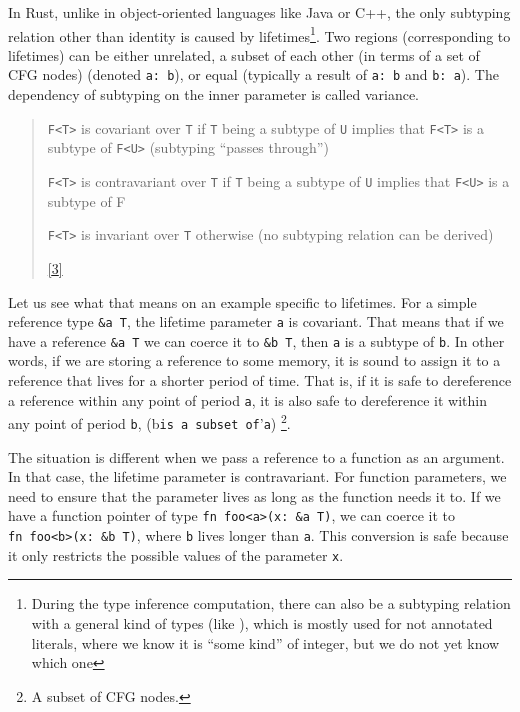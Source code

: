 \documentclass[
  11pt,
  twoside,symmetric]{report}
\begin{document}
In Rust, unlike in object-oriented languages like Java or C++, the only
subtyping relation other than identity is caused by
lifetimes\footnote{During the type inference computation, there can also
  be a subtyping relation with a general kind of types (like ), which is
  mostly used for not annotated literals, where we know it is ``some
  kind'' of integer, but we do not yet know which one}. Two regions
(corresponding to lifetimes) can be either unrelated, a subset of each
other (in terms of a set of CFG nodes) (denoted
\texttt{\textquotesingle{}a:\ \textquotesingle{}b}), or equal (typically
a result of \texttt{\textquotesingle{}a:\ \textquotesingle{}b} and
\texttt{\textquotesingle{}b:\ \textquotesingle{}a}). The dependency of
subtyping on the inner parameter is called variance.

\begin{quote}
\texttt{F\textless{}T\textgreater{}} is covariant over \texttt{T} if
\texttt{T} being a subtype of \texttt{U} implies that
\texttt{F\textless{}T\textgreater{}} is a subtype of
\texttt{F\textless{}U\textgreater{}} (subtyping ``passes through'')

\texttt{F\textless{}T\textgreater{}} is contravariant over \texttt{T} if
\texttt{T} being a subtype of \texttt{U} implies that
\texttt{F\textless{}U\textgreater{}} is a subtype of F

\texttt{F\textless{}T\textgreater{}} is invariant over \texttt{T}
otherwise (no subtyping relation can be derived)

\protect\hyperlink{ref-reference}{{[}3{]}}
\end{quote}

Let us see what that means on an example specific to lifetimes. For a
simple reference type \texttt{\&\textquotesingle{}a\ T}, the lifetime
parameter \texttt{\textquotesingle{}a} is covariant. That means that if
we have a reference \texttt{\&\textquotesingle{}a\ T} we can coerce it
to \texttt{\&\textquotesingle{}b\ T}, then \texttt{\textquotesingle{}a}
is a subtype of \texttt{\textquotesingle{}b}. In other words, if we are
storing a reference to some memory, it is sound to assign it to a
reference that lives for a shorter period of time. That is, if it is
safe to dereference a reference within any point of period
\texttt{\textquotesingle{}a}, it is also safe to dereference it within
any point of period \texttt{\textquotesingle{}b},
(\texttt{\textquotesingle{}}b\texttt{is\ a\ subset\ of}'\texttt{a})
\footnote{A subset of CFG nodes.}.

The situation is different when we pass a reference to a function as an
argument. In that case, the lifetime parameter is contravariant. For
function parameters, we need to ensure that the parameter lives as long
as the function needs it to. If we have a function pointer of type
\texttt{fn\ foo\textless{}\textquotesingle{}a\textgreater{}(x:\ \&\textquotesingle{}a\ T)},
we can coerce it to
\texttt{fn\ foo\textless{}\textquotesingle{}b\textgreater{}(x:\ \&\textquotesingle{}b\ T)},
where \texttt{\textquotesingle{}b} lives longer than
\texttt{\textquotesingle{}a}. This conversion is safe because it only
restricts the possible values of the parameter \texttt{x}.
\end{document}
